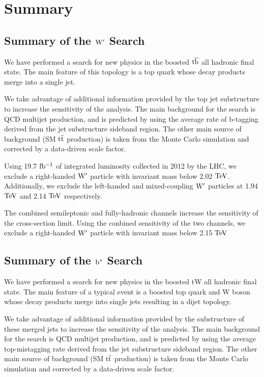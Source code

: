\clearpage
\newpage
\chapter{Summary}

\section{Summary of the $\mathrm{W}^{\prime}$ Search}
We have performed a search for new physics in the boosted $\mathrm{t\overline{b}}$ all
hadronic final state.  The main feature of this topology is a top quark
whose decay products merge into a single jet. 

We take advantage of additional information provided by the top jet
substructure to increase the sensitivity of the analysis.  The main background for
the search is QCD multijet production, and is predicted by using the
average rate of b-tagging derived from the jet substructure sideband
region.  The other main source of background (SM $\mathrm{t\overline{t}}$ production) is taken from 
the Monte Carlo simulation and corrected by a data-driven scale factor.

Using 19.7$~\mathrm{fb^{-1}}$ of integrated luminosity collected in 2012 by the
LHC, we exclude a right-handed $\mathrm{W}^{\prime}$ particle with invariant mass
below 2.02 $\mathrm{TeV}$.  Additionally, we exclude the left-handed and mixed-coupling $\mathrm{W}^{\prime}$ particles at 1.94 $\mathrm{TeV}$ and 2.14 $\mathrm{TeV}$ respectively.

The combined semileptonic and fully-hadronic channels increase the sensitivity of the cross-section limit.  
Using the conbined sensitivity of the two channels, we exclude a right-handed $\mathrm{W}^{\prime}$ particle with invariant mass below 2.15$~\mathrm{TeV}$  



\section{Summary of the $\mathrm{b}^{*}$ Search}
We have performed a search for new physics in the boosted tW all
hadronic final state.  The main feature of a typical event is a boosted top quark and W boson
whose decay products merge into single jets resulting in a dijet topology. 

We take advantage of additional information provided by the 
substructure of these merged jets  to increase the sensitivity of the analysis.  The main background for
the search is QCD multijet production, and is predicted by using the
average top-mistagging rate derived from the jet substructure sideband
region.  The other main source of background (SM $\mathrm{t\overline{t}}$ production) is taken from 
the Monte Carlo simulation and corrected by a data-driven scale factor.

